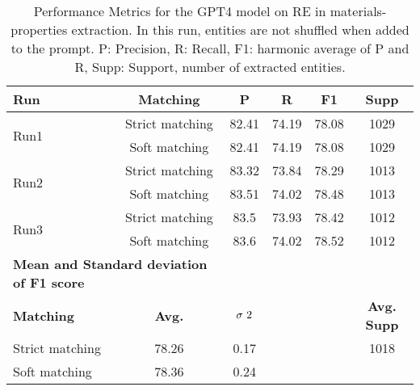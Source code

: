 \begin{table}[htbp]
    \small
    \centering
    \caption{Performance Metrics for the GPT4 model on RE in materials-properties extraction. In this run, entities are not shuffled when added to the prompt. P: Precision, R: Recall, F1: harmonic average of P and R, Supp: Support, number of extracted entities.}
    \begin{tabular}{lccccc}
        \toprule
        \textbf{Run} & \textbf{Matching} & \textbf{P} & \textbf{R} & \textbf{F1} & \textbf{Supp} \\
        \midrule
        \multirow{2}{*}{Run1} & Strict matching & 82.41 & 74.19 & 78.08 & 1029 \\
        & Soft matching & 82.41 & 74.19 & 78.08 & 1029 \\
        \midrule
        \multirow{2}{*}{Run2} & Strict matching & 83.32 & 73.84 & 78.29 & 1013 \\
        & Soft matching & 83.51 & 74.02 & 78.48 & 1013 \\
        \midrule
        \multirow{2}{*}{Run3} & Strict matching & 83.5 & 73.93 & 78.42 & 1012 \\
        & Soft matching & 83.6 & 74.02 & 78.52 & 1012 \\
        \midrule
        \multicolumn{2}{l}{\textbf{Mean and Standard deviation of F1 score}} & & & & \\
        \midrule
        \textbf{Matching} & \textbf{Avg.} & $\sigma\textsuperscript{2}$ & & & \textbf{Avg. Supp}\\
        Strict matching & 78.26 & 0.17 & & & 1018 \\
        Soft matching & 78.36 & 0.24 & & \\
        \bottomrule
    \end{tabular}
\end{table}


